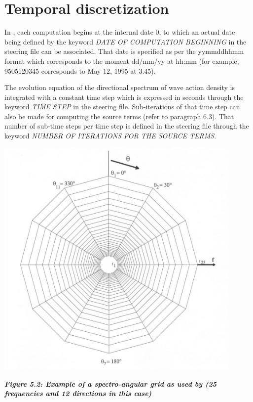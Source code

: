 \section{ Temporal discretization}

 In \tomawac, each computation begins at the internal date 0, to which an actual date being defined by the keyword \textit{DATE OF COMPUTATION BEGINNING} in the steering file can be associated. That date is specified as per the yymmddhhmm format which corresponds to the moment dd/mm/yy at hh:mm (for example, 9505120345 corresponds to May 12, 1995 at 3.45).

 The evolution equation of the directional spectrum of wave action density is integrated with a constant time step which is expressed in seconds through the keyword \textit{TIME STEP} in the steering file. Sub-iterations of that time step can also be made for computing the source terms (refer to paragraph 6.3). That number of sub-time steps per time step is defined in the steering file through the keyword \textit{NUMBER OF ITERATIONS FOR THE SOURCE TERMS}.

 

 \includegraphics*[width=4.73in]{graphics/spectroangular}

 \textbf{\textit{Figure 5.2: Example of a spectro-angular grid as used by \tomawac (25 frequencies and 12 directions in this case)}}


